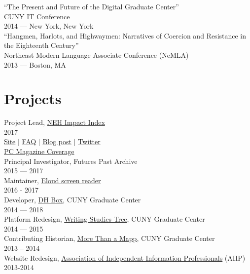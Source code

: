 \documentclass[11pt]{article}
\begin{document}
“The Present and Future of the Digital Graduate Center”\\
CUNY IT Conference\\
2014 — New York, New York\\

“Hangmen, Harlots, and Highwaymen: Narratives of Coercion and Resistance in the Eighteenth Century”\\
Northeast Modern Language Associate Conference (NeMLA)\\
2013 — Boston, MA\\

\section*{Projects}
\label{sec:orgheadline10}
Project Lead, \href{http://www.nehimpact.org/}{NEH Impact Index}\\
2017\\
\href{http://www.nehimpact.org/}{Site} | \href{http://www.nehimpact.org/faq}{FAQ} | \href{https://digitalfellows.commons.gc.cuny.edu/2017/04/10/exploring-the-local-impact-of-the-neh-neh-impact-index/}{Blog post} | \href{https://twitter.com/psmyth01/status/851505002900336644}{Twitter}\\
\href{http://www.pcmag.com/commentary/353904/trump-budget-slashes-neh-funding-why-you-should-care}{PC Magazine Coverage}\\

Principal Investigator, Futures Past Archive\\
2015 — 2017\\

Maintainer, \href{https://github.com/smythp/eloud}{Eloud screen reader}\\
2016 - 2017\\

Developer, \href{http://dhbox.org/}{DH Box}, CUNY Graduate Center\\
2014 — 2018\\

Platform Redesign, \href{http://www.writingstudiestree.org/}{Writing Studies Tree}, CUNY Graduate Center\\
2014 — 2015\\

Contributing Historian, \href{http://www.morethanamapp.org/}{More Than a Mapp}, CUNY Graduate Center\\
2013 – 2014\\

Website Redesign, \href{http://www.aiip.org/}{Association of Independent Information Professionals} (AIIP)\\
2013-2014\\
\end{document}
